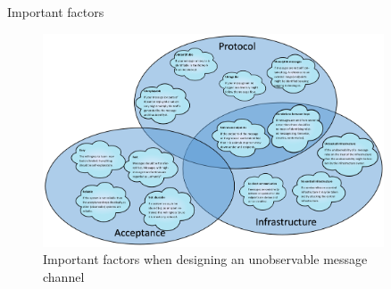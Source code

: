 \documentclass[10pt]{beamer}
\newlength{\sepwid}
\newlength{\onecolwid}
\newlength{\twocolwid}
\begin{document}
\begin{frame}[t]
\begin{columns}[t]
\begin{column}{\twocolwid}
{\begin{alertblock}{Important factors}
\begin{figure}
\includegraphics[width=\linewidth]{clouds_full.png}
\caption{Important factors when designing an unobservable message channel}
\end{figure}
\end{alertblock} 
}


\end{column} %

\begin{column}{\sepwid}\end{column} %

\begin{column}{\onecolwid} %



\end{column}
\end{columns}
\end{frame}
\end{document}
